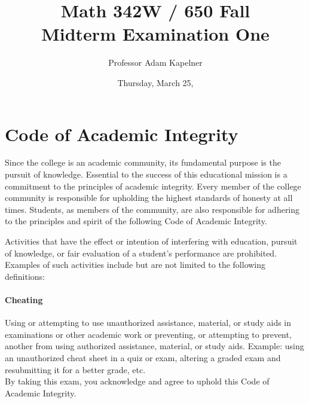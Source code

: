 \documentclass[12pt,landscape]{article}
\title{Math 342W / 650 Fall \the\year{} \\ Midterm Examination One}
\author{Professor Adam Kapelner}
\date{Thursday, March 25, \the\year{}}
\begin{document}
\maketitle


\thispagestyle{empty}

\section*{Code of Academic Integrity}

\footnotesize
Since the college is an academic community, its fundamental purpose is the pursuit of knowledge. Essential to the success of this educational mission is a commitment to the principles of academic integrity. Every member of the college community is responsible for upholding the highest standards of honesty at all times. Students, as members of the community, are also responsible for adhering to the principles and spirit of the following Code of Academic Integrity.

Activities that have the effect or intention of interfering with education, pursuit of knowledge, or fair evaluation of a student's performance are prohibited. Examples of such activities include but are not limited to the following definitions:

\paragraph{Cheating} Using or attempting to use unauthorized assistance, material, or study aids in examinations or other academic work or preventing, or attempting to prevent, another from using authorized assistance, material, or study aids. Example: using an unauthorized cheat sheet in a quiz or exam, altering a graded exam and resubmitting it for a better grade, etc.
\\

\noindent By taking this exam, you acknowledge and agree to uphold this Code of Academic Integrity. \\


\normalsize
\end{document}
